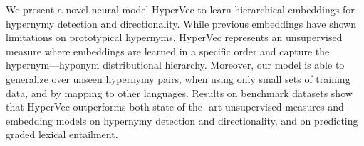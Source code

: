 We present a novel neural model HyperVec to learn hierarchical embeddings for hypernymy detection and directionality. While previous embeddings have shown limitations on prototypical hypernyms, HyperVec represents an unsupervised measure where embeddings are learned in a specific order and capture the hypernym---hyponym distributional hierarchy. Moreover, our model is able to generalize over unseen hypernymy pairs, when using only small sets of training data, and by mapping to other languages. Results on benchmark datasets show that HyperVec outperforms both state-of-the- art unsupervised measures and embedding models on hypernymy detection and directionality, and on predicting graded lexical entailment.
